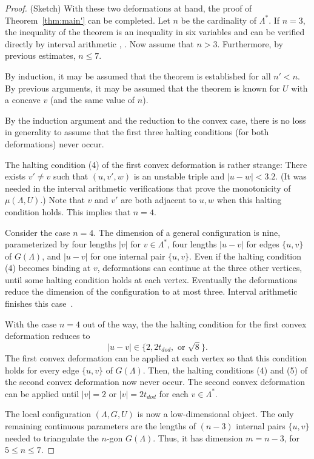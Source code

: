 \documentclass{article} %
\begin{document}
\begin{proof} (Sketch) With these two deformations at hand, the proof
of Theorem~\ref{thm:main'} can be completed. Let $n$ be the
cardinality of $\Lambda^*$. If $n=3$, the inequality of the theorem is
an inequality in six variables and can be verified directly by
interval arithmetic \cite{McLaughlin:2008:KeplerCode},
\cite[\S7.4.1]{Hales:2002:Dodec}. Now assume that $n>3$. Furthermore,
by previous estimates, $n\le 7$.


By induction, it may be assumed that
the theorem is established for all $n'<n$.  By previous arguments,
it may be assumed that the theorem is known for $U$ with a concave
$v$ (and the same value of $n$).

By the induction argument and the reduction to the convex case,
there is no loss in generality to assume that the first three
halting conditions (for both deformations) never occur.  

The  halting condition (4) of the first convex deformation is rather strange:
There exists $v'\ne v$ such that 
$(u,v',w)$ is an unstable triple and $|u-w|<3.2$.
(It was needed in the interval arithmetic verifications
that prove the monotonicity of $\mu(\Lambda,U)$.)  Note
that $v$ and $v'$ are both adjacent to $u,w$ when this
halting condition holds.  This implies that $n=4$.  

Consider the case $n=4$.  The dimension of a general configuration
is nine, parameterized by four lengths $|v|$ for $v\in\Lambda^*$,
four lengths $|u-v|$ for edges $\{u,v\}$ of $G(\Lambda)$, and $|u-v|$
for one internal pair $\{u,v\}$.
Even
if the halting condition (4) becomes binding at $v$, deformations
can continue at the three other vertices, until some halting
condition holds at each vertex.  Eventually the deformations
reduce the dimension of the configuration to at most three.
Interval arithmetic finishes this case~\cite[\S7.4.2]{Hales:2002:Dodec}.

With the case $n=4$ out of the way, the
the halting condition for the first convex deformation
reduces to
  $$
  |u-v| \in\{ 2, 2t_{dod}, \text{ or } \sqrt8\}.
  $$
The first convex deformation can be applied at each vertex 
so that this condition holds for every edge $\{u,v\}$ of $G(\Lambda)$.
Then, the halting conditions (4) and (5) of the second convex
deformation now never occur.  The second convex deformation can
be applied until $|v|=2$ or $|v|=2t_{dod}$ for each $v\in\Lambda^*$.

The local configuration $(\Lambda,G,U)$ is now a low-dimensional
object.  The only remaining continuous parameters are the lengths of
$(n-3)$ internal pairs $\{u,v\}$ needed to triangulate the
$n$-gon $G(\Lambda)$.  Thus, it has dimension $m=n-3$,
for $5\le n\le 7$.


\end{proof}
\end{document}
